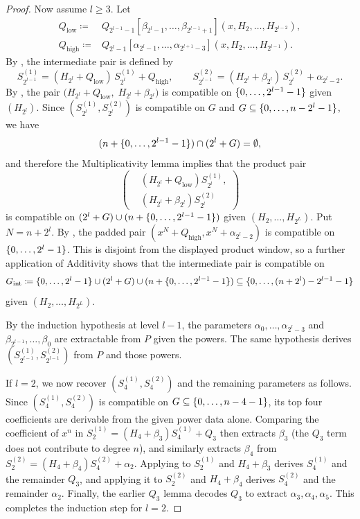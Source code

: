 \begin{proof}
    Now assume $l\ge 3$.
    Let
    \[
      \begin{aligned}
      Q_{\mathrm{low}}\coloneqq{}&
        Q_{2^{l-1}-1}[\beta_{2^l-1},\ldots,\beta_{2^{l-1}+1}]
          (x,H_2,\ldots,H_{2^{l-2}}),\\
      Q_{\mathrm{high}}\coloneqq{}&
        Q_{2^l-1}[\alpha_{2^l-1},\ldots,\alpha_{2^{l+1}-3}]
          (x,H_2,\ldots,H_{2^{l-1}}).
      \end{aligned}
    \]
    By , the intermediate pair is defined by
    \[
      S^{(1)}_{2^{l-1}}=(H_{2^l}+Q_{\mathrm{low}})\,S^{(1)}_{2^l}+Q_{\mathrm{high}},
      \qquad
      S^{(2)}_{2^{l-1}}=(H_{2^l}+\beta_{2^l})\,S^{(2)}_{2^l}+\alpha_{2^l-2}.
    \]
    By , the pair $\bigl(H_{2^l}+Q_{\mathrm{low}},\;H_{2^l}+\beta_{2^l}\bigr)$ is compatible on $\{0,\dotsc,2^{l-1}-1\}$ given $(H_{2^l})$.
    Since $(S^{(1)}_{2^l},S^{(2)}_{2^l})$ is compatible on $G$ and $G\subseteq\{0,\dotsc,n-2^l-1\}$, we have
    \[
      (n+\{0,\dotsc,2^{l-1}-1\})\cap(2^l+G)=\emptyset,
    \]
    and therefore the Multiplicativity lemma implies that the product pair
    \[
      \left(
      \begin{aligned}
        &(H_{2^l}+Q_{\mathrm{low}})S^{(1)}_{2^l},\\[-2pt]
        &(H_{2^l}+\beta_{2^l})S^{(2)}_{2^l}
      \end{aligned}
      \right)
    \]
    is compatible on $(2^l+G)\cup(n+\{0,\dotsc,2^{l-1}-1\})$ given $(H_2,\ldots,H_{2^L})$.
    Put $N=n+2^l$.  By , the padded pair
    $(x^N+Q_{\mathrm{high}},x^N+\alpha_{2^l-2})$ is compatible on
    $\{0,\dotsc,2^l-1\}$.  This is disjoint from the displayed product window, so a
    further application of Additivity shows that the intermediate pair is
    compatible on
    \[
      G_{\mathrm{int}}\coloneqq \{0,\dotsc,2^l-1\}\cup(2^l+G)\cup(n+\{0,\dotsc,2^{l-1}-1\})
      \subseteq \{0,\dotsc,(n+2^l)-2^{l-1}-1\}
    \]
    given $(H_2,\ldots,H_{2^L})$.

    By the induction hypothesis at level $l-1$, the parameters
    $\alpha_0,\ldots,\alpha_{2^l-3}$ and
    $\beta_{2^{l-1}},\ldots,\beta_0$ are extractable from $P$ given the
    powers.  The same hypothesis derives
    $(S^{(1)}_{2^{l-1}},S^{(2)}_{2^{l-1}})$ from $P$ and those powers.

    If $l=2$, we now recover $(S^{(1)}_{4},S^{(2)}_{4})$ and the remaining parameters as follows.
    Since $(S^{(1)}_{4},S^{(2)}_{4})$ is compatible on $G\subseteq\{0,\dotsc,n-4-1\}$, its top four coefficients are derivable from the given power data alone.
    Comparing the coefficient of $x^{n}$ in $S^{(1)}_{2}=(H_{4}+\beta_3)S^{(1)}_{4}+Q_3$ then extracts $\beta_3$ (the $Q_3$ term does not contribute to degree $n$), and similarly extracts $\beta_4$ from $S^{(2)}_{2}=(H_{4}+\beta_4)S^{(2)}_{4}+\alpha_2$.
    Applying  to $S^{(1)}_{2}$ and $H_4+\beta_3$ derives $S^{(1)}_{4}$ and the remainder $Q_3$, and applying it to $S^{(2)}_{2}$ and $H_4+\beta_4$ derives $S^{(2)}_{4}$ and the remainder $\alpha_2$.
    Finally, the earlier $Q_3$ lemma decodes $Q_3$ to extract $\alpha_3,\alpha_4,\alpha_5$.
    This completes the induction step for $l=2$.


\end{proof}
